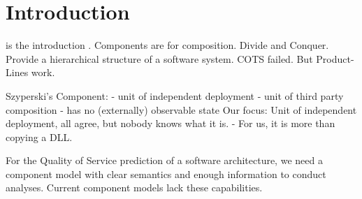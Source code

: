 \section{Introduction}
 is the introduction \cite{balsamo2004b}.
Components are for composition.
Divide and Conquer. Provide a hierarchical structure of a software system.
COTS failed. But Product-Lines work.

Szyperski's Component:
-	unit of independent deployment
-	unit of third party composition
-	has no (externally) observable state
Our focus: Unit of independent deployment, all agree, but nobody knows what it is. - For us, it is more than copying a DLL.

For the Quality of Service prediction of a software architecture, we need a component model with clear semantics and enough information to conduct analyses. Current component models lack these capabilities.
